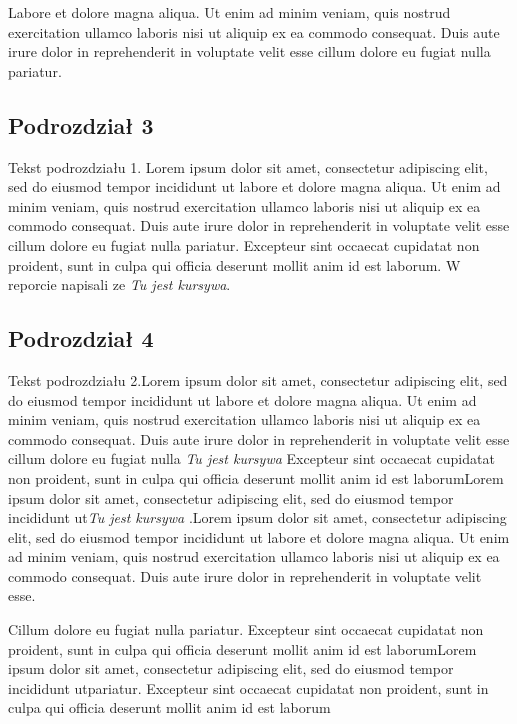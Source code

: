 \documentclass[12pt,a4paper,titlepage]{article}
\begin{document}
Labore et dolore magna aliqua. Ut enim ad minim veniam, quis nostrud exercitation ullamco laboris nisi ut aliquip ex ea commodo consequat. Duis aute irure dolor in reprehenderit in voluptate velit esse cillum dolore eu fugiat nulla pariatur. 

\subsection{Podrozdział 3}

Tekst podrozdziału 1. Lorem ipsum dolor sit amet, consectetur adipiscing elit, sed do eiusmod tempor incididunt ut labore et dolore magna aliqua. Ut enim ad minim veniam, quis nostrud exercitation ullamco laboris nisi ut aliquip ex ea commodo consequat. Duis aute irure dolor in reprehenderit in voluptate velit esse cillum dolore eu fugiat nulla pariatur. Excepteur sint occaecat cupidatat non proident, sunt in culpa qui officia deserunt mollit anim id est laborum. W reporcie \cite{report1} napisali ze \textit{Tu jest kursywa}.

\subsection{Podrozdział 4}

Tekst podrozdziału 2.Lorem ipsum dolor sit amet, consectetur adipiscing elit, sed do eiusmod tempor incididunt ut labore et dolore magna aliqua. Ut enim ad minim veniam, quis nostrud exercitation ullamco laboris nisi ut aliquip ex ea commodo consequat. Duis aute irure dolor in reprehenderit in voluptate velit esse cillum dolore eu fugiat nulla \textit{Tu jest kursywa}  Excepteur sint occaecat cupidatat non proident, sunt in culpa qui officia deserunt mollit anim id est laborumLorem ipsum dolor sit amet, consectetur adipiscing elit, sed do eiusmod tempor incididunt ut\textit{Tu jest kursywa} .Lorem ipsum dolor sit amet, consectetur adipiscing elit, sed do eiusmod tempor incididunt ut labore et dolore magna aliqua. Ut enim ad minim veniam, quis nostrud exercitation ullamco laboris nisi ut aliquip ex ea commodo consequat. Duis aute irure dolor in reprehenderit in voluptate velit esse. \par Cillum dolore eu fugiat nulla pariatur. Excepteur sint occaecat cupidatat non proident, sunt in culpa qui officia deserunt mollit anim id est laborumLorem ipsum dolor sit amet, consectetur adipiscing elit, sed do eiusmod tempor incididunt utpariatur. Excepteur sint occaecat cupidatat non proident, sunt in culpa qui officia deserunt mollit anim id est laborum
\end{document}
